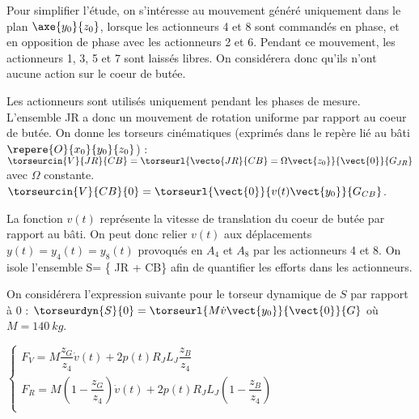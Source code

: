 Pour simplifier l’étude, on s’intéresse au mouvement généré uniquement dans le plan 
$\axe{y_0}{z_0}$, lorsque les actionneurs 4 et 8 sont commandés en phase, et en opposition de
phase avec les actionneurs 2 et 6. Pendant ce mouvement, les actionneurs 1, 3, 5 et 7 sont
laissés libres. On considérera donc qu’ils n’ont aucune action sur le coeur de butée.

\ifprof
\else
\fi

Les actionneurs sont utilisés uniquement pendant les phases de mesure. L’ensemble JR a
donc un mouvement de rotation uniforme par rapport au coeur de butée. On donne les
torseurs cinématiques (exprimés dans le repère lié au bâti $\repere{O}{x_0}{y_0}{z_0}$) : 
$\torseurcin{V}{JR}{CB} =\torseurl{\vecto{JR}{CB}=\Omega\vect{z_0}}{\vect{0}}{G_{JR}}$ avec $\Omega$ constante.
$\torseurcin{V}{CB}{0} =\torseurl{\vect{0}}{v(t)\vect{y_0}}{G_{CB}}$.

La fonction $v(t)$ représente la vitesse de translation du coeur de butée par rapport au bâti.
On peut donc relier $v(t)$ aux déplacements $y(t) = y_4(t) = y_8(t)$ provoqués en $A_4$ et $A_8$
par les actionneurs 4 et 8.
On isole l’ensemble S= \{ JR + CB\} afin de quantifier les efforts dans les actionneurs.

On considérera l’expression suivante pour le torseur dynamique de $S$ par rapport à 0 :
$\torseurdyn{S}{0}=\torseurl{M\dot{v}\vect{y_0}}{\vect{0}}{G}$
où $M = \SI{140}{kg}$.

\ifprof
\else
\fi


$\left\{
\begin{array}{l}
F_V = M\dfrac{z_G}{z_4}\dot{v}(t) + 2p(t)R_J L_J \dfrac{z_B}{z_4} \\
F_R = M\left(1-\dfrac{z_G}{z_4}\right)\dot{v}(t) + 2p(t)R_J L_J\left(1- \dfrac{z_B}{z_4}\right) \\
\end{array}
\right.$

\ifprof
\else
\fi

\ifprof
\else
\fi

\ifprof
\else


\fi